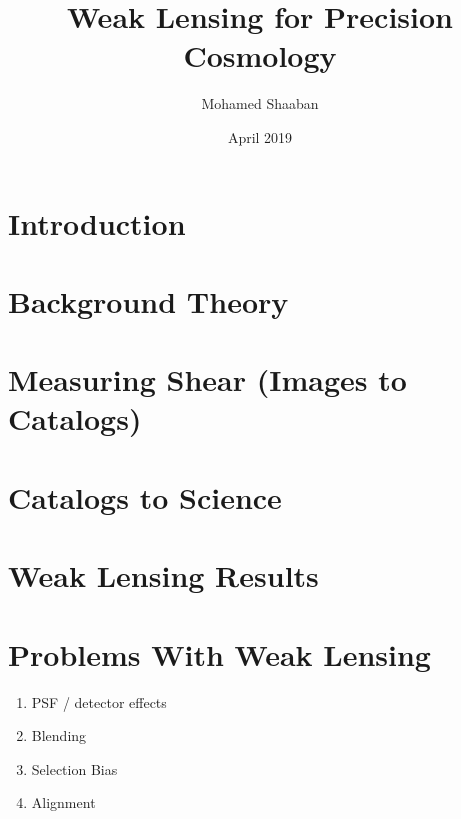 \documentclass{article}
\title{Weak Lensing for Precision Cosmology}
\author{Mohamed Shaaban}
\date{April 2019}
\begin{document}
\maketitle

\section{Introduction}


\section{Background Theory}



\section{Measuring Shear (Images to Catalogs)}


\section{Catalogs to Science}
\cite{lensingbook} \cite{rachel_2018} \cite{hoekstra}

\section{Weak Lensing Results}
\cite{Subaru_2019}

\section{Problems With Weak Lensing}
\cite{massey_2013}

\begin{enumerate}
    \item PSF / detector effects 
    \item Blending
    \item Selection Bias
    \item Alignment 
\end{enumerate}



\end{document}
